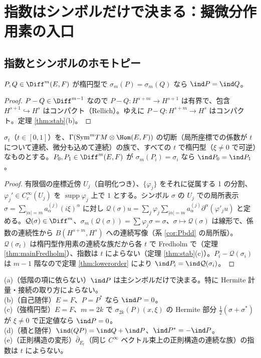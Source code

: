 
\section{指数はシンボルだけで決まる：擬微分作用素の入口}\label{sec:indsym}
\subsection{指数とシンボルのホモトピー}
\begin{thm}\label{thm:lowerorder}\tP
$P,Q\in\Diff^m(E,F)$ が楕円型で $\sigma_m(P)=\sigma_m(Q)$ なら $\ind P=\ind Q$。
\end{thm}
\begin{proof}
$P-Q\in\Diff^{m-1}$ なので $P-Q:H^{s+m}\to H^{s+1}$ は有界で、包含 $H^{s+1}\hookrightarrow H^s$ はコンパクト（Rellich）。ゆえに $P-Q:H^{s+m}\to H^s$ はコンパクト。定理 \ref{thm:stab}(b)。
\end{proof}
\begin{thm}[シンボルのホモトピー不変性]\label{thm:symhomotopy}\tP
$\sigma_t$（$t\in[0,1]$）を、$\Gamma(\mathrm{Sym}^mTM\otimes\Hom(E,F))$ の切断（局所座標での係数が $t$ について連続、微分も込めて連続）の族で、すべての $t$ で楕円型（$\xi\ne0$ で可逆）なものとする。$P_0,P_1\in\Diff^m(E,F)$ が $\sigma_m(P_i)=\sigma_i$ なら $\ind P_0=\ind P_1$。
\end{thm}
\begin{proof}
有限個の座標近傍 $U_j$（自明化つき）、$\{\varphi_j\}$ をそれに従属する 1 の分割、$\varphi_j'\in C^\infty_c(U_j)$ を $\operatorname{supp}\varphi_j$ 上で $1$ とする。シンボル $\sigma$ の $U_j$ での局所表示 $\sigma=\sum_{|\alpha|=m}a^{(j)}_\alpha(i\xi)^\alpha$ に対し $\mathcal Q(\sigma)u=\sum_j\varphi_j\sum_{|\alpha|=m}a^{(j)}_\alpha\partial^\alpha(\varphi'_ju)$ と定める。$\mathcal Q(\sigma)\in\Diff^m$、$\sigma_m(\mathcal Q(\sigma))=\sum\varphi_j\sigma=\sigma$、$\sigma\mapsto\mathcal Q(\sigma)$ は線形で、係数の連続性から $B(H^{s+m},H^s)$ への連続写像（系 \ref{cor:Pbdd} の局所版）。$\mathcal Q(\sigma_t)$ は楕円型作用素の連続な族だから各 $t$ で Fredholm で（定理 \ref{thm:mainFredholm}）、指数は $t$ によらない（定理 \ref{thm:stab}(c)）。$P_i-\mathcal Q(\sigma_i)$ は $m-1$ 階なので定理 \ref{thm:lowerorder} により $\ind P_i=\ind\mathcal Q(\sigma_i)$。
\end{proof}
\begin{cor}\label{cor:indzero}\tP
(a)（低階の項に依らない）$\ind P$ は主シンボルだけで決まる。特に Hermite 計量・接続の取り方によらない。\\
(b)（自己随伴）$E=F$、$P=P^*$ なら $\ind P=0$。\\
(c)（強楕円型）$E=F$、$m=2k$ で $\sigma_{2k}(P)(x,\xi)$ の Hermite 部分 $\frac12(\sigma+\sigma^*)$ が $\xi\ne0$ で正定値なら $\ind P=0$。\\
(d)（積と随伴）$\ind(QP)=\ind Q+\ind P$、$\ind P^*=-\ind P$。\\
(e)（正則構造の変形）$\bar\partial_{E_t}$（同じ $C^\infty$ ベクトル束上の正則構造の連続な族）の指数は $t$ によらない。
\end{cor}
